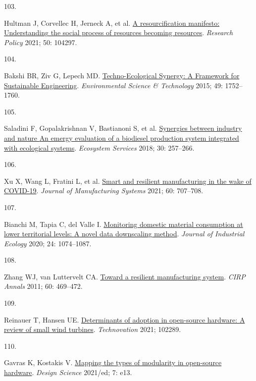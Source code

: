 \documentclass[
  11pt,
  a4paperpaper,
  onecolumn]{article}
\newlength{\cslhangindent}
\newlength{\csllabelwidth}
\newlength{\cslentryspacingunit} %
\newenvironment{CSLReferences}[2] %
 {%
  \setlength{\parindent}{0pt}
  \ifodd #1
  \let\oldpar\par
  \def\par{\hangindent=\cslhangindent\oldpar}
  \fi
  \setlength{\parskip}{#2\cslentryspacingunit}
 }%
 {}
\newcommand{\CSLLeftMargin}[1]{\parbox[t]{\csllabelwidth}{#1}}
\newcommand{\CSLRightInline}[1]{\parbox[t]{\linewidth - \csllabelwidth}{#1}\break}
\begin{document}
\begin{CSLReferences}{0}{0}
\leavevmode{}%
\CSLLeftMargin{103. }%
\CSLRightInline{Hultman J, Corvellec H, Jerneck A, et al.
\href{https://doi.org/10.1016/j.respol.2021.104297}{A resourcification
manifesto: {Understanding} the social process of resources becoming
resources}. \emph{Research Policy} 2021; 50: 104297.}

\leavevmode{}%
\CSLLeftMargin{104. }%
\CSLRightInline{Bakshi BR, Ziv G, Lepech MD.
\href{https://doi.org/10.1021/es5041442}{Techno-{Ecological Synergy}: {A
Framework} for {Sustainable Engineering}}. \emph{Environmental Science
\& Technology} 2015; 49: 1752--1760.}

\leavevmode{}%
\CSLLeftMargin{105. }%
\CSLRightInline{Saladini F, Gopalakrishnan V, Bastianoni S, et al.
\href{https://doi.org/10.1016/j.ecoser.2018.02.004}{Synergies between
industry and nature \textendash{} {An} emergy evaluation of a biodiesel
production system integrated with ecological systems}. \emph{Ecosystem
Services} 2018; 30: 257--266.}

\leavevmode{}%
\CSLLeftMargin{106. }%
\CSLRightInline{Xu X, Wang L, Fratini L, et al.
\href{https://doi.org/10.1016/j.jmsy.2021.07.025}{Smart and resilient
manufacturing in the wake of {COVID-19}}. \emph{Journal of Manufacturing
Systems} 2021; 60: 707--708.}

\leavevmode{}%
\CSLLeftMargin{107. }%
\CSLRightInline{Bianchi M, Tapia C, del Valle I.
\href{https://doi.org/10.1111/jiec.13000}{Monitoring domestic material
consumption at lower territorial levels: {A} novel data downscaling
method}. \emph{Journal of Industrial Ecology} 2020; 24: 1074--1087.}

\leavevmode{}%
\CSLLeftMargin{108. }%
\CSLRightInline{Zhang WJ, van Luttervelt CA.
\href{https://doi.org/10.1016/j.cirp.2011.03.041}{Toward a resilient
manufacturing system}. \emph{CIRP Annals} 2011; 60: 469--472.}

\leavevmode{}%
\CSLLeftMargin{109. }%
\CSLRightInline{Reinauer T, Hansen UE.
\href{https://doi.org/10.1016/j.technovation.2021.102289}{Determinants
of adoption in open-source hardware: {A} review of small wind turbines}.
\emph{Technovation} 2021; 102289.}

\leavevmode{}%
\CSLLeftMargin{110. }%
\CSLRightInline{Gavras K, Kostakis V.
\href{https://doi.org/10.1017/dsj.2021.11}{Mapping the types of
modularity in open-source hardware}. \emph{Design Science} 2021/ed; 7:
e13.}


\end{CSLReferences}
\end{document}
